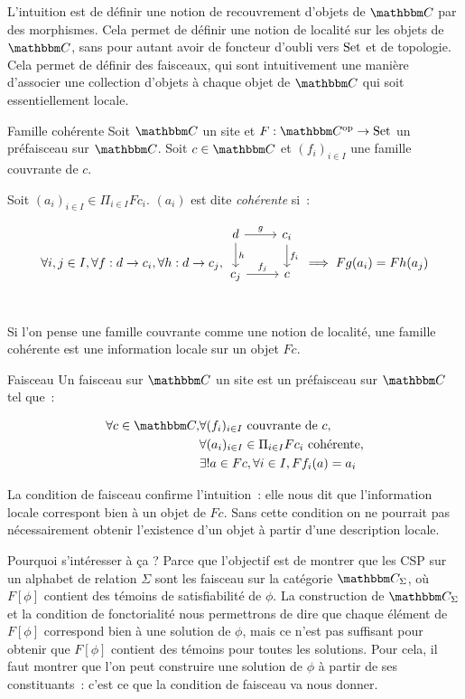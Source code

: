 L'intuition est de définir une notion de recouvrement d'objets de $\C$ par des morphismes.
Cela permet de définir une notion de localité sur les objets de $\C$, sans pour autant
avoir de foncteur d'oubli vers $\text{Set}$ et de topologie. Cela permet de définir des
faisceaux, qui sont intuitivement une manière d'associer une collection d'objets à
chaque objet de $\C$ qui soit essentiellement locale.

\begin{defi}{Famille cohérente}
    Soit $\C$ un site et $F : \C^{\text{op}}\rightarrow\Set$ un préfaisceau sur
    $\C$. Soit $c\in\C$ et $(f_i)_{i\in I}$ une famille couvrante de $c$.
    
    Soit $(a_i)_{i\in I}\in \Pi_{i\in I} Fc_i$. $(a_i)$ est dite \emph{cohérente} si~:

    \[\forall i,j\in I, \forall f : d\rightarrow c_i, \forall h : d\rightarrow c_j,
      \begin{tikzcd}
          d \arrow[r, "g"] \arrow[d, "h"] & c_i \arrow[d, "f_i"] \\
          c_j \arrow[r, "f_j"] & c \\
      \end{tikzcd}
      \implies Fg(a_i) = Fh(a_j) \]
\end{defi}

Si l'on pense une famille couvrante comme une notion de localité, une famille cohérente
est une information locale sur un objet $Fc$.

\begin{defi}{Faisceau}
    Un faisceau sur $\C$ un site est un préfaisceau sur $\C$ tel que~:

    \begin{align*}
        \forall c\in\C, & \forall (f_i)_{i\in I}\text{ couvrante de } c, \\
                        & \forall (a_i)_{i\in I}\in\Pi_{i\in I}Fc_i \text{ cohérente}, \\
                        & \exists ! a\in Fc, \forall i\in I, Ff_i(a) = a_i
    \end{align*}
\end{defi}

La condition de faisceau confirme l'intuition~: elle nous dit que l'information locale
correspont bien à un objet de $Fc$. Sans cette condition on ne pourrait pas nécessairement
obtenir l'existence d'un objet à partir d'une description locale.

Pourquoi s'intéresser à ça ? Parce que l'objectif est de montrer que les CSP
sur un alphabet de relation $\Sigma$ sont les faisceau sur la catégorie
$\C_\Sigma$, où $F[\phi]$ contient des témoins de satisfiabilité de $\phi$. La
construction de $\C_\Sigma$ et la condition de fonctorialité nous permettrons
de dire que chaque élément de $F[\phi]$ correspond bien à une solution de
$\phi$, mais ce n'est pas suffisant pour obtenir que $F[\phi]$ contient des
témoins pour toutes les solutions. Pour cela, il faut montrer que l'on peut
construire une solution de $\phi$ à partir de ses constituants~: c'est ce que
la condition de faisceau va nous donner.

